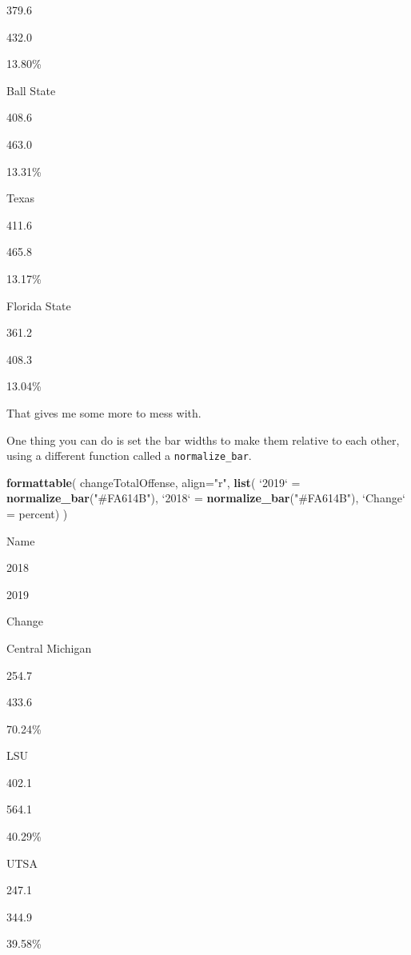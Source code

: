 \documentclass[]{book}
\newenvironment{Shaded}{\begin{snugshade}}{\end{snugshade}}
\newcommand{\DataTypeTok}[1]{\textcolor[rgb]{0.13,0.29,0.53}{#1}}
\newcommand{\KeywordTok}[1]{\textcolor[rgb]{0.13,0.29,0.53}{\textbf{#1}}}
\newcommand{\NormalTok}[1]{#1}
\newcommand{\StringTok}[1]{\textcolor[rgb]{0.31,0.60,0.02}{#1}}
\begin{document}
379.6

{432.0}

13.80\%

Ball State

408.6

{463.0}

13.31\%

Texas

411.6

{465.8}

13.17\%

Florida State

361.2

{408.3}

13.04\%

That gives me some more to mess with.

One thing you can do is set the bar widths to make them relative to each other, using a different function called a \texttt{normalize\_bar}.

\begin{Shaded}
\begin{Highlighting}[]
\KeywordTok{formattable}\NormalTok{(}
\NormalTok{  changeTotalOffense, }
  \DataTypeTok{align=}\StringTok{"r"}\NormalTok{,}
  \KeywordTok{list}\NormalTok{(}
    \StringTok{`}\DataTypeTok{2019}\StringTok{`}\NormalTok{ =}\StringTok{ }\KeywordTok{normalize_bar}\NormalTok{(}\StringTok{"#FA614B"}\NormalTok{), }
    \StringTok{`}\DataTypeTok{2018}\StringTok{`}\NormalTok{ =}\StringTok{ }\KeywordTok{normalize_bar}\NormalTok{(}\StringTok{"#FA614B"}\NormalTok{), }
    \StringTok{`}\DataTypeTok{Change}\StringTok{`}\NormalTok{ =}\StringTok{ }\NormalTok{percent)}
\NormalTok{  )}
\end{Highlighting}
\end{Shaded}

Name

2018

2019

Change

Central Michigan

{254.7}

{433.6}

70.24\%

LSU

{402.1}

{564.1}

40.29\%

UTSA

{247.1}

{344.9}

39.58\%
\end{document}
